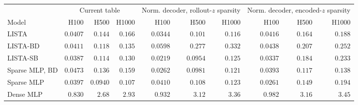 \begin{tabular}[t]{@{}l rrr rrr rrr@{}}
\toprule
& \multicolumn{3}{c}{Current table} & \multicolumn{3}{c}{Norm. decoder, rollout-\(z\) sparsity} & \multicolumn{3}{c}{Norm. decoder, encoded-\(z\) sparsity} \\
\cmidrule(lr){2-4}\cmidrule(lr){5-7}\cmidrule(l){8-10}
Model & H100 & H500 & H1000 & H100 & H500 & H1000 & H100 & H500 & H1000 \\
\midrule
LISTA & $0.0407$ & $0.144$ & $0.166$ & $0.0344$ & $0.101$ & $0.116$ & $0.0416$ & $0.164$ & $0.188$ \\
LISTA-BD & $0.0411$ & $0.118$ & $0.135$ & $0.0598$ & $0.277$ & $0.332$ & $0.0438$ & $0.207$ & $0.252$ \\
LISTA-SB & $0.0387$ & $0.114$ & $0.130$ & $0.0219$ & $0.0954$ & $0.125$ & $0.0337$ & $0.184$ & $0.233$ \\
Sparse MLP, BD & $0.0473$ & $0.136$ & $0.159$ & $0.0262$ & $0.0981$ & $0.121$ & $0.0393$ & $0.117$ & $0.138$ \\
Sparse MLP & $0.0397$ & $0.0940$ & $0.107$ & $0.0410$ & $0.108$ & $0.123$ & $0.0261$ & $0.149$ & $0.194$ \\
\midrule
Dense MLP & $0.830$ & $2.68$ & $2.93$ & $0.932$ & $3.12$ & $3.36$ & $0.982$ & $3.16$ & $3.45$ \\
\bottomrule
\end{tabular}
